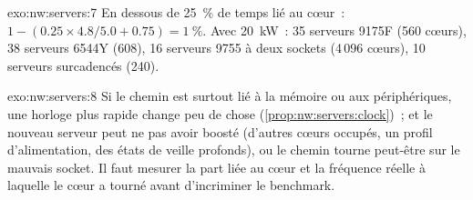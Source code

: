 \begin{solution}{exo:nw:servers:7}
En dessous de 25~\% de temps lié au cœur~: $1 - (0.25 \times 4.8/5.0 + 0.75) = 1~\%$. Avec \qty{20}{\kilo\watt}~: 35 serveurs 9175F (560 cœurs), 38 serveurs 6544Y
(608), 16 serveurs 9755 à deux sockets (4\,096 cœurs), 10 serveurs surcadencés (240).
\end{solution}

\begin{solution}{exo:nw:servers:8}
Si le chemin est surtout lié à la mémoire ou aux périphériques, une horloge plus rapide change peu de chose (\cref{prop:nw:servers:clock})~; et le nouveau serveur peut ne pas
avoir boosté (d'autres cœurs occupés, un profil d'alimentation, des états de veille profonds), ou le chemin tourne peut-être sur le mauvais socket. Il faut mesurer la part liée au cœur et
la fréquence réelle à laquelle le cœur a tourné avant d'incriminer le benchmark.
\end{solution}

